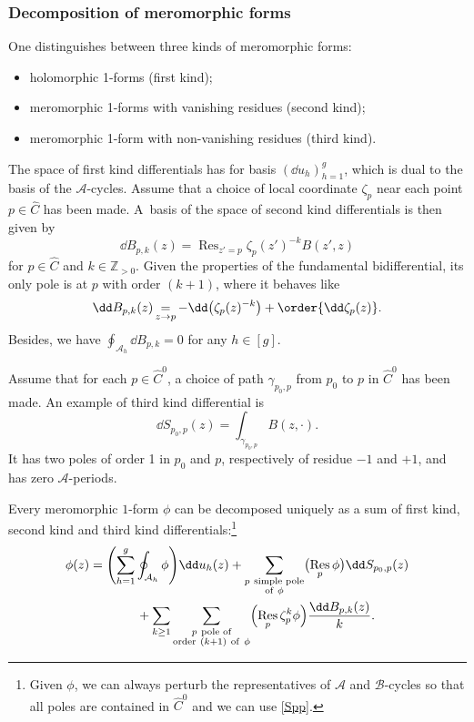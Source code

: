 \documentclass[pdftex]{sigma}
\numberwithin{equation}{section}
\newcommand{\A}{\mathcal{A}}
\newcommand{\B}{\mathcal{B}}
\begin{document}
\subsubsection{Decomposition of meromorphic forms}
\label{sec:decomp-merom-forms}

One distinguishes between three kinds of meromorphic forms:
\begin{itemize}\itemsep=0pt
 \item holomorphic 1-forms (first kind);
 \item meromorphic 1-forms with vanishing residues (second kind);
 \item meromorphic 1-form with non-vanishing residues (third kind).
\end{itemize}

The space of first kind differentials has for basis $(\dd u_{h})_{h = 1}^{g}$, which is dual to the basis of the $\A$-cycles.
Assume that a choice of local coordinate $\zeta_p$ near each point $p \in \widehat{C}$ has been made. A~basis of the space of second kind differentials is then given by
\begin{equation*}
 \dd B_{p,k}(z) = \mathop{\mathrm{Res}}_{z' = p}\zeta_{p}(z')^{-k}B(z', z)
\end{equation*}
for $p \in \widehat{C}$ and $k \in \mathbb{Z}_{> 0}$. Given the properties of the fundamental bidifferential, its only pole is at $p$ with order $(k + 1)$, where it behaves like
\[
\dd B_{p,k}(z) \mathop{=}_{z \rightarrow p} -\dd\bigl(\zeta_{p}(z)^{-k}\bigr) + \order{\dd \zeta_p(z)}.
\]
Besides, we have $\oint_{\A_h} \dd B_{p,k} = 0$ for any $h \in [g]$.

Assume that for each $p \in \widehat{C}^0$, a choice of path $\gamma_{p_0,p}$ from $p_0$ to $p$ in $\widehat{C}^0$ has been made. An example of third kind differential is
\begin{equation}
 \label{Spp} \dd S_{p_0,p}(z) = \int_{\gamma_{p_0,p}} B(z, \cdot).
\end{equation}
It has two poles of order 1 in $p_0$ and $p$, respectively of residue $-1$ and $+1$, and has zero $\A$-periods.

Every meromorphic $1$-form $\phi$ can be decomposed uniquely as a sum of first kind, second kind and third kind differentials:\footnote{Given $\phi$, we can always perturb the representatives of $\A$ and $\B$-cycles so that all poles are contained in $\widehat{C}^0$ and we can use \eqref{Spp}.}
\begin{gather*}
\phi(z) = \Biggl(\sum_{h = 1}^{g} \oint_{\A_h} \phi\Biggr) \dd u_h(z) + \sum_{\substack{p\ \text{simple pole} \\ \text{of}\ \phi}} \bigl(\mathop{\text{Res}}_{p} \phi\bigr) \dd S_{p_0,p}(z) \\
\hphantom{\phi(z) =}{}
 + \sum_{k \geq 1} \sum_{\substack{p\ \text{pole of} \\ \text{order}\ (k + 1)\ {\rm of}\ \phi}} \Bigl(\mathop{\mathrm{Res}}_{p} \zeta_p^{k} \phi \Bigr)\frac{\dd B_{p,k}(z)}{k}.
\end{gather*}
\end{document}
